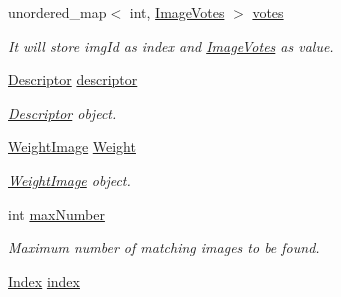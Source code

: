 \begin{DoxyCompactItemize}
\item 
\hypertarget{classMatchingImage_acffbf75099f1a39f35bb2296301828c8}{unordered\-\_\-map$<$ int, \hyperlink{classImageVotes}{\-Image\-Votes} $>$ \hyperlink{classMatchingImage_acffbf75099f1a39f35bb2296301828c8}{votes}}\label{classMatchingImage_acffbf75099f1a39f35bb2296301828c8}

\begin{DoxyCompactList}\small\item\em \-It will store img\-Id as index and \hyperlink{classImageVotes}{\-Image\-Votes} as value. \end{DoxyCompactList}\item 
\hypertarget{classMatchingImage_a95e570f95473d1879d0bc67966dd5a6b}{\hyperlink{classDescriptor}{\-Descriptor} \hyperlink{classMatchingImage_a95e570f95473d1879d0bc67966dd5a6b}{descriptor}}\label{classMatchingImage_a95e570f95473d1879d0bc67966dd5a6b}

\begin{DoxyCompactList}\small\item\em \hyperlink{classDescriptor}{\-Descriptor} object. \end{DoxyCompactList}\item 
\hypertarget{classMatchingImage_a2b29bfff30c24d43f3ffb674a1ee3911}{\hyperlink{classWeightImage}{\-Weight\-Image} \hyperlink{classMatchingImage_a2b29bfff30c24d43f3ffb674a1ee3911}{\-Weight}}\label{classMatchingImage_a2b29bfff30c24d43f3ffb674a1ee3911}

\begin{DoxyCompactList}\small\item\em \hyperlink{classWeightImage}{\-Weight\-Image} object. \end{DoxyCompactList}\item 
\hypertarget{classMatchingImage_a3ea900f8b77ed661c806b2f66ecc7b3b}{int \hyperlink{classMatchingImage_a3ea900f8b77ed661c806b2f66ecc7b3b}{max\-Number}}\label{classMatchingImage_a3ea900f8b77ed661c806b2f66ecc7b3b}

\begin{DoxyCompactList}\small\item\em \-Maximum number of matching images to be found. \end{DoxyCompactList}\item 
\hypertarget{classMatchingImage_adbe968ad134d521a353558558973130d}{\hyperlink{classIndex}{\-Index} \hyperlink{classMatchingImage_adbe968ad134d521a353558558973130d}{index}}\label{classMatchingImage_adbe968ad134d521a353558558973130d}


\end{DoxyCompactItemize}
